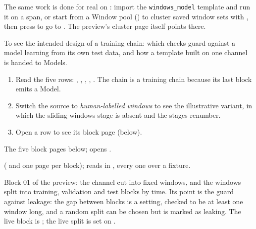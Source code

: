 \begin{watchout}
The same work is done for real on : import the \texttt{windows\_model}
template and run it on a span, or start from a Window pool () to
cluster saved window sets with , then press  to
go to . The preview's cluster page itself points there.
\end{watchout}

To see the intended design of a training chain: which checks guard against a model learning from
its own test data, and how a template built on one channel is handed to Models.


\begin{enumerate}
  \item Read the five rows: , , ,
        , . The chain is a training chain because its last block emits
        a Model.
  \item Switch the source to \emph{human-labelled windows} to see the illustrative variant, in
        which the sliding-windows stage is absent and the stages renumber.
  \item Open a row to see its block page (below).
\end{enumerate}

The five block pages below;  opens .

\begin{underthehood}
 ( and one page per block); reads in
, every one  over a fixture.
\end{underthehood}

Block 01 of the preview: the channel cut into fixed windows, and the windows split into training,
validation and test blocks by time. Its point is the guard against leakage: the gap between blocks
is a setting, checked to be at least one window long, and a random split can be chosen but is
marked as leaking. The live block is ; the live split is
set on .

